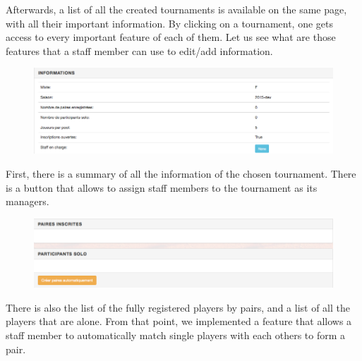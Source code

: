 \documentclass[a4paper, 12pt]{article}
\begin{document}
Afterwards, a list of all the created tournaments is available on the same page, with all their important information. By clicking on a tournament, one gets access to every important feature of each of them. Let us see what are those features that a staff member can use to edit/add information.\\

\begin{figure}[h]
\includegraphics[scale=0.5]{infotournament.png}
\end{figure}
\FloatBarrier
First, there is a summary of all the information of the chosen tournament. There is a button that allows to assign staff members to the tournament as its managers.\\

\begin{figure}[h]
\includegraphics[scale=0.5]{participtournament.png}
\end{figure}
\FloatBarrier
There is also the list of the fully registered players by pairs, and a list of all the players that are alone. From that point, we implemented a feature that allows a staff member to automatically match single players with each others to form a pair.\\
\end{document}
